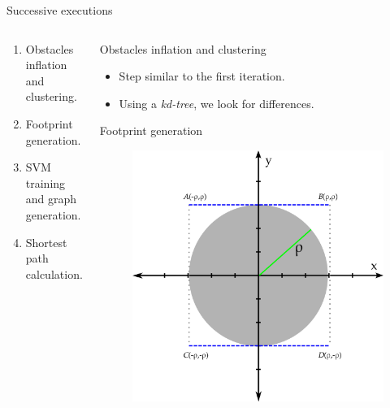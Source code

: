 \begin{frame}{Successive executions}
  \begin{columns}
  \hskip -0.5cm
    \begin{overlayarea}{\textwidth}{\textheight}
      \begin{enumerate}
	\item<1-> Obstacles inflation and clustering.
	\item<2-> Footprint generation.
	\item<3-> SVM training and graph generation.
	\item<4-> Shortest path calculation.
      \end{enumerate}
    \end{overlayarea}
    \vskip -1cm
    \begin{overlayarea}{\textwidth}{\textheight}
       {
	\begin{block}{Obstacles inflation and clustering}
	  \begin{itemize}
	    \item Step similar to the first iteration.
	    \item Using a \emph{kd-tree}, we look for differences.
	  \end{itemize}
	\end{block}
      }
       {
	\begin{block}{Footprint generation}
	  \begin{figure}
	      \includegraphics[height=0.4\textheight]{figure5}

\end{figure}
\end{block}}
\end{overlayarea}
\end{columns}
\end{frame}
